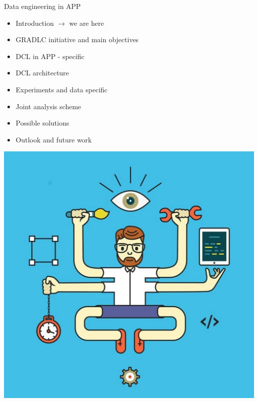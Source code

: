 \begin{frame}{Data engineering in APP}
\begin{minipage}[c]{0.46\textwidth}
  \begin{itemize}
    \item  Introduction \textcolor{kit-green100}{$\rightarrow$ we are here}
    \item  GRADLC initiative and main objectives
    \item  DCL in APP - specific
    \item  DCL architecture
    \item  Experiments and data specific
    \item  Joint analysis scheme
    \item  Possible solutions
    \item  Outlook and future work
  \end{itemize}
\end{minipage}
\hfill
\begin{minipage}[c]{0.46\textwidth}
  \includegraphics[width=1\textwidth]{pics/DE_fun.pdf}
\end{minipage}
\end{frame}

